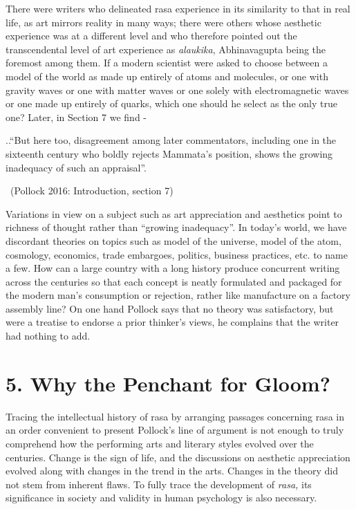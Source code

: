 There were writers who delineated rasa experience in its similarity to that in real life, as art mirrors reality in many ways; there were others whose aesthetic experience was at a different level and who therefore pointed out the transcendental level of art experience as \textit{alaukika}, Abhinavagupta being the foremost among them. If a modern scientist were asked to choose between a model of the world as made up entirely of atoms and molecules, or one with gravity waves or one with matter waves or one solely with electromagnetic waves or one made up entirely of quarks, which one should he select as the only true one? Later, in Section 7 we find -

\newpage

\begin{myquote}
..``But here too, disagreement among later commentators, including one in the sixteenth century who boldly rejects Mammata’s position, shows the growing inadequacy of such an appraisal”. 

~\hfill (Pollock 2016: Introduction, section 7)
\end{myquote}

Variations in view on a subject such as art appreciation and aesthetics point to richness of thought rather than “growing inadequacy”. In today’s world, we have discordant theories on topics such as model of the universe, model of the atom, cosmology, economics, trade embargoes, politics, business practices, etc. to name a few. How can a large country with a long history produce concurrent writing across the centuries so that each concept is neatly formulated and packaged for the modern man’s consumption or rejection, rather like manufacture on a factory assembly line? On one hand Pollock says that no theory was satisfactory, but were a treatise to endorse a prior thinker’s views, he complains that the writer had nothing to add.


\section*{5. Why the Penchant for Gloom?}

Tracing the intellectual history of rasa by arranging passages concerning rasa in an order convenient to present Pollock’s line of argument is not enough to truly comprehend how the performing arts and literary styles evolved over the centuries. Change is the sign of life, and the discussions on aesthetic appreciation evolved along with changes in the trend in the arts. Changes in the theory did not stem from inherent flaws. To fully trace the development of \textit{rasa,} its significance in society and validity in human psychology is also necessary.


